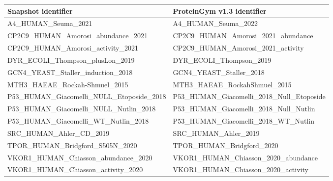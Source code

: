 \documentclass[11pt,a4paper]{article}
\begin{document}
\begin{center}\footnotesize\begin{tabular}{ll}
\toprule
Snapshot identifier & ProteinGym v1.3 identifier \\
\midrule
A4\_HUMAN\_Seuma\_2021 & A4\_HUMAN\_Seuma\_2022 \\
CP2C9\_HUMAN\_Amorosi\_abundance\_2021 & CP2C9\_HUMAN\_Amorosi\_2021\_abundance \\
CP2C9\_HUMAN\_Amorosi\_activity\_2021 & CP2C9\_HUMAN\_Amorosi\_2021\_activity \\
DYR\_ECOLI\_Thompson\_plusLon\_2019 & DYR\_ECOLI\_Thompson\_2019 \\
GCN4\_YEAST\_Staller\_induction\_2018 & GCN4\_YEAST\_Staller\_2018 \\
MTH3\_HAEAE\_Rockah-Shmuel\_2015 & MTH3\_HAEAE\_RockahShmuel\_2015 \\
P53\_HUMAN\_Giacomelli\_NULL\_Etoposide\_2018 & P53\_HUMAN\_Giacomelli\_2018\_Null\_Etoposide \\
P53\_HUMAN\_Giacomelli\_NULL\_Nutlin\_2018 & P53\_HUMAN\_Giacomelli\_2018\_Null\_Nutlin \\
P53\_HUMAN\_Giacomelli\_WT\_Nutlin\_2018 & P53\_HUMAN\_Giacomelli\_2018\_WT\_Nutlin \\
SRC\_HUMAN\_Ahler\_CD\_2019 & SRC\_HUMAN\_Ahler\_2019 \\
TPOR\_HUMAN\_Bridgford\_S505N\_2020 & TPOR\_HUMAN\_Bridgford\_2020 \\
VKOR1\_HUMAN\_Chiasson\_abundance\_2020 & VKOR1\_HUMAN\_Chiasson\_2020\_abundance \\
VKOR1\_HUMAN\_Chiasson\_activity\_2020 & VKOR1\_HUMAN\_Chiasson\_2020\_activity \\
\bottomrule
\end{tabular}\end{center}
\end{document}
